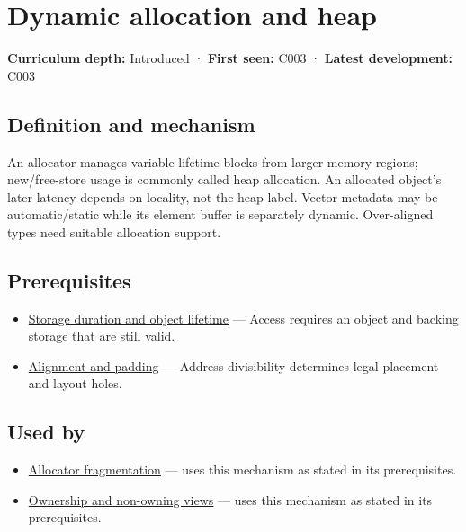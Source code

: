 \hypertarget{appendix-c3480f7d9ff3}{}\label{referencestart:appendix-c3480f7d9ff3}
\section{Dynamic allocation and heap}\label{appendix-c3480f7d9ff3-dynamic-allocation-and-heap}

\textbf{Curriculum depth:} Introduced · \textbf{First seen:} C003 · \textbf{Latest development:} C003

\subsection{Definition and mechanism}\label{appendix-c3480f7d9ff3-definition-and-mechanism}

An allocator manages variable-lifetime blocks from larger memory regions; new/free-store usage is commonly called heap allocation. An allocated object's later latency depends on locality, not the heap label. Vector metadata may be automatic/static while its element buffer is separately dynamic. Over-aligned types need suitable allocation support.

\subsection{Prerequisites}\label{appendix-c3480f7d9ff3-prerequisites}

\begin{itemize}
\tightlist
\item
  \hyperref[appendix-0b104bcba06b]{Storage duration and object lifetime} --- Access requires an object and backing storage that are still valid.
\item
  \hyperref[appendix-a1f7c53b4742]{Alignment and padding} --- Address divisibility determines legal placement and layout holes.
\end{itemize}

\subsection{Used by}\label{appendix-c3480f7d9ff3-used-by}

\begin{itemize}
\tightlist
\item
  \hyperref[appendix-a7c50686d81f]{Allocator fragmentation} --- uses this mechanism as stated in its prerequisites.
\item
  \hyperref[appendix-d52e4486f527]{Ownership and non-owning views} --- uses this mechanism as stated in its prerequisites.
\end{itemize}

